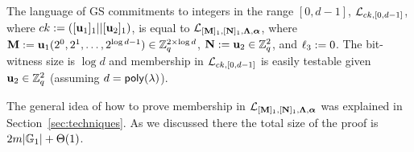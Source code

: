 \begin{example}
The language of GS commitments to integers in the range $[0,d-1]$, $\mathcal{L}_{ck,[0,d-1]}$, where $ck:=([\mathbf{u}_1]_1||[\mathbf{u}_2]_1)$, is equal to $\mathcal{L}_{[\mathbf{{M}}]_1,[\mathbf{{N}}]_1,\mathbf{{\Lambda}},{\boldsymbol \alpha}}$, where
$\mathbf{{M}}:=\mathbf{u}_1(2^0,2^1,\ldots,2^{\log d-1})\in\mathbb{Z}_q^{2\times \log d}$, $\mathbf{{N}}:=\mathbf{u}_2\in\mathbb{Z}_q^{2}$, and ${\ell_3}:=0$. The bit-witness size is $\log d$ and membership in $\mathcal{L}_{ck,[0,d-1]}$ is easily testable given $\mathbf{u}_2 \in \mathbb{Z}_q^2$
(assuming $d=\mathsf{poly}(\lambda)$). 
\end{example}

The general idea of how to prove membership in $\mathcal{L}_{[\mathbf{{M}}]_1,[\mathbf{{N}}]_1,\mathbf{{\Lambda}},{\boldsymbol \alpha}}$ was explained in Section~\ref{sec:techniques}. As we discussed there the total size of the proof is $2{m}|\mathbb{G}_1|+\Theta(1)$.
